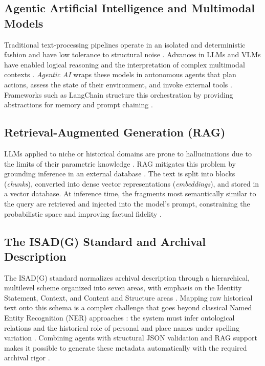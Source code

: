 \documentclass[conference]{IEEEtran}
\begin{document}
\subsection{Agentic Artificial Intelligence and Multimodal Models}

Traditional text-processing pipelines operate in an isolated and deterministic fashion and have low tolerance to structural noise \cite{surveyOCR}. Advances in LLMs and VLMs have enabled logical reasoning and the interpretation of complex multimodal contexts \cite{nlpsurvey}. \textit{Agentic AI} wraps these models in autonomous agents that plan actions, assess the state of their environment, and invoke external tools \cite{agenticaisurvey}. Frameworks such as LangChain structure this orchestration by providing abstractions for memory and prompt chaining \cite{LangChain}.

\subsection{Retrieval-Augmented Generation (RAG)}

LLMs applied to niche or historical domains are prone to hallucinations due to the limits of their parametric knowledge \cite{rag}. RAG mitigates this problem by grounding inference in an external database \cite{rag}. The text is split into blocks (\textit{chunks}), converted into dense vector representations (\textit{embeddings}), and stored in a vector database. At inference time, the fragments most semantically similar to the query are retrieved and injected into the model's prompt, constraining the probabilistic space and improving factual fidelity \cite{rag}.

\subsection{The ISAD(G) Standard and Archival Description}

The ISAD(G) standard normalizes archival description through a hierarchical, multilevel scheme organized into seven areas, with emphasis on the Identity Statement, Context, and Content and Structure areas \cite{isad_g_2001}. Mapping raw historical text onto this schema is a complex challenge that goes beyond classical Named Entity Recognition (NER) approaches \cite{nlpsurvey}: the system must infer ontological relations and the historical role of personal and place names under spelling variation \cite{isad_g_2001}. Combining agents with structural JSON validation and RAG support makes it possible to generate these metadata automatically with the required archival rigor \cite{isad_g_2001}.
\end{document}

